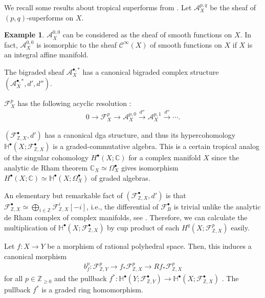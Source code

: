 \documentclass[a4paper,dvipdfmx,reqno,12pt]{amsart}
\theoremstyle{definition}
\newtheorem{example}[theorem]{Example}
\newcommand{\C}{\mathbb{C}}%
\newcommand{\Z}{\mathbb{Z}}%
\newcommand{\mb}[1]{\mathbb{#1}}%
\newcommand{\mcal}[1]{\mathcal{#1}}%
\newcommand{\xto}[1]{\xrightarrow{#1}}
\numberwithin{equation}{section}
\begin{document}
 

We recall some results about tropical superforms from
\cite{MR3903579,smacka2017differential}.
Let $\mathcal{A}^{p,q}_X$ be the sheaf of 
$(p,q)$-superforms on $X$. 
\begin{example}
$\mathcal{A}_X^{0,0}$ can be considered as the 
sheaf of smooth functions on $X$.
In fact, $\mathcal{A}_X^{0,0}$ is isomorphic to 
the sheaf $\mathcal{C}^{\infty}(X)$ of smooth functions 
on $X$ if $X$ is an integral affine manifold.
\end{example}
The bigraded sheaf $\mathcal{A}_X^{\bullet,*}$ has 
a canonical bigraded
complex structure
$(\mathcal{A}_X^{\bullet,*},d',d'')$.

$\mcal{F}^{p}_{X}$ has the following acyclic resolution
\cite[Corollary 3.18, Lemma 3.21]{MR3903579}:
\begin{align}
  0 \to \mcal{F}^{p}_{X} \to \mcal{A}^{p,0}_{X}\xto{d''} 
\mcal{A}^{p,1}_{X} \xto{d''}\cdots.
\end{align}

$(\mathcal{F}_{\mathbb{Z},X}^{\bullet},d')$ has a canonical dga structure, 
and thus its hypercohomology 
$\mb{H}^{\bullet}(X;\mcal{F}_{\mathbb{Z},X}^{\bullet})$ is a 
graded-commutative algebra. 
This is a certain tropical analog of the singular cohomology
$H^{\bullet}(X;\C)$ for a complex manifold $X$ since 
the analytic de Rham theorem $\C_X \simeq \Omega_X^{\bullet}$ 
gives isomorphism 
$H^{\bullet}(X;\C)\simeq \mb{H}^{\bullet}(X;\Omega_X^{\bullet})$
of graded algebras. 

An elementary but remarkable fact of 
$(\mcal{F}_{\mathbb{Z},X}^{\bullet},d')$ is that 
$\mcal{F}_{\mathbb{Z},X}^{\bullet}\simeq 
\bigoplus_{i\in \Z}\mcal{F}_{\mathbb{Z},X}^{i}[-i]$, i.e., the differential 
of $\mcal{F}_{B}^{\bullet}$ is trivial unlike the analytic de Rham complex
of complex manifolds, see \cite[Corollary 2.15]{smacka2017differential}.
Therefore, we can calculate the multiplication of 
$\mb{H}^{\bullet}(X;\mcal{F}_{\mathbb{Z},X}^{\bullet})$ by 
cup product of each $H^{q}(X;\mcal{F}_{\mathbb{Z},X}^{p})$ easily.

Let $f\colon X\to Y$ be a morphism of rational polyhedral 
space. Then, this induces a canonical morphism
\begin{align}
b_f^{p}\colon \mathcal{F}^{p}_{\mathbb{Z},Y}\to 
f_* \mathcal{F}^{p}_{\mathbb{Z},X} \to
Rf_*\mathcal{F}^{p}_{\mathbb{Z},X}
\end{align}
for all $p\in \mathbb{Z}_{\geq 0}$ and the pullback 
$f^{*}\colon 
\mb{H}^{\bullet}(Y;\mcal{F}_{\Z, Y}^{\bullet})\to 
\mb{H}^{\bullet}(X;\mcal{F}_{\Z, X}^{\bullet})$
\cite[Proposition 4.17]{gross2019sheaftheoretic}.
The pullback $f^{*}$ is a graded ring homomorphism. 
\end{document}
